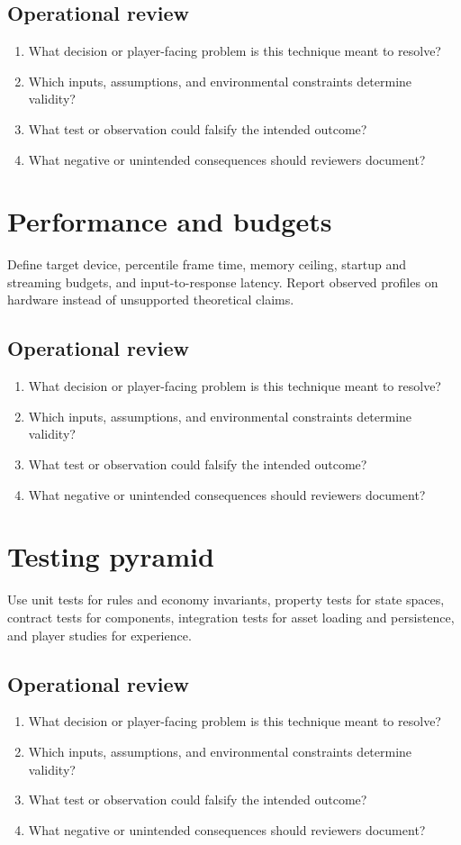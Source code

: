 \documentclass[11pt]{article}
\begin{document}
\subsection{Operational review}
\begin{enumerate}
\item What decision or player-facing problem is this technique meant to resolve?
\item Which inputs, assumptions, and environmental constraints determine validity?
\item What test or observation could falsify the intended outcome?
\item What negative or unintended consequences should reviewers document?
\end{enumerate}

\section{Performance and budgets}
Define target device, percentile frame time, memory ceiling, startup and streaming budgets, and input-to-response latency. Report observed profiles on hardware instead of unsupported theoretical claims.


\subsection{Operational review}
\begin{enumerate}
\item What decision or player-facing problem is this technique meant to resolve?
\item Which inputs, assumptions, and environmental constraints determine validity?
\item What test or observation could falsify the intended outcome?
\item What negative or unintended consequences should reviewers document?
\end{enumerate}

\section{Testing pyramid}
Use unit tests for rules and economy invariants, property tests for state spaces, contract tests for components, integration tests for asset loading and persistence, and player studies for experience.


\subsection{Operational review}
\begin{enumerate}
\item What decision or player-facing problem is this technique meant to resolve?
\item Which inputs, assumptions, and environmental constraints determine validity?
\item What test or observation could falsify the intended outcome?
\item What negative or unintended consequences should reviewers document?
\end{enumerate}
\end{document}
